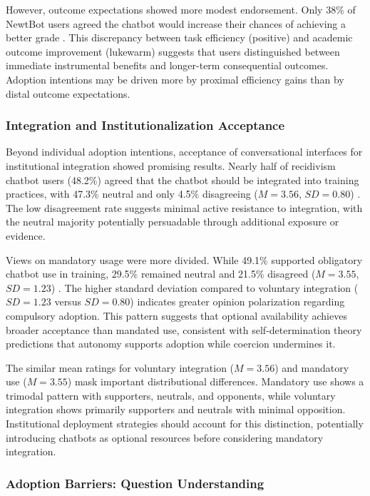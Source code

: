 \documentclass[manuscript,anonymous,sigconf]{acmart}
\begin{document}
However, outcome expectations showed more modest endorsement. Only 38\% of NewtBot users agreed the chatbot would increase their chances of achieving a better grade \cite{A22}. This discrepancy between task efficiency (positive) and academic outcome improvement (lukewarm) suggests that users distinguished between immediate instrumental benefits and longer-term consequential outcomes. Adoption intentions may be driven more by proximal efficiency gains than by distal outcome expectations.

\subsubsection{Integration and Institutionalization Acceptance}

Beyond individual adoption intentions, acceptance of conversational interfaces for institutional integration showed promising results. Nearly half of recidivism chatbot users (48.2\%) agreed that the chatbot should be integrated into training practices, with 47.3\% neutral and only 4.5\% disagreeing ($M = 3.56$, $SD = 0.80$) \cite{A54}. The low disagreement rate suggests minimal active resistance to integration, with the neutral majority potentially persuadable through additional exposure or evidence.

Views on mandatory usage were more divided. While 49.1\% supported obligatory chatbot use in training, 29.5\% remained neutral and 21.5\% disagreed ($M = 3.55$, $SD = 1.23$) \cite{A54}. The higher standard deviation compared to voluntary integration ($SD = 1.23$ versus $SD = 0.80$) indicates greater opinion polarization regarding compulsory adoption. This pattern suggests that optional availability achieves broader acceptance than mandated use, consistent with self-determination theory predictions that autonomy supports adoption while coercion undermines it.

The similar mean ratings for voluntary integration ($M = 3.56$) and mandatory use ($M = 3.55$) mask important distributional differences. Mandatory use shows a trimodal pattern with supporters, neutrals, and opponents, while voluntary integration shows primarily supporters and neutrals with minimal opposition. Institutional deployment strategies should account for this distinction, potentially introducing chatbots as optional resources before considering mandatory integration.

\subsubsection{Adoption Barriers: Question Understanding}
\end{document}
